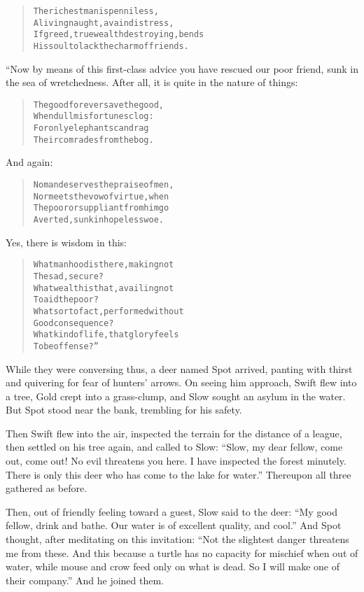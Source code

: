 \documentclass[article, twoside, 14pt]{memoir}
\renewenvironment{verbatim}{%
\begin{quote}%
\vskip -10pt%
\begin{alltt}\normalfont\large}{\end{alltt}%
\end{quote}%
\vskip -10pt
} %
\begin{document}
\begin{verbatim}
The richest man is penniless,
A living naught, a vain distress,
If greed, true wealth destroying, bends
His soul to lack the charm of friends.
\end{verbatim}
“Now by means of this first-class advice you have rescued our poor
friend, sunk in the sea of wretchedness. After all, it is quite in
the nature of things:

\begin{verbatim}
The good forever save the good,
    When dull misfortunes clog:
For only elephants can drag
    Their comrades from the bog.
\end{verbatim}
And again:

\begin{verbatim}
No man deserves the praise of men,
Nor meets the vow of virtue, when
The poor or suppliant from him go
Averted, sunk in hopeless woe.
\end{verbatim}
Yes, there is wisdom in this:

\begin{verbatim}
What manhood is there, making not
    The sad, secure?
What wealth is that, availing not
    To aid the poor?
What sort of act, performed without
    Good consequence?
What kind of life, that glory feels
    To be offense?”
\end{verbatim}
While they were conversing thus, a deer named Spot arrived, panting
with thirst and quivering for fear of hunters' arrows. On seeing
him approach, Swift flew into a tree, Gold crept into a
grass-clump, and Slow sought an asylum in the water. But Spot stood
near the bank, trembling for his safety.

Then Swift flew into the air, inspected the terrain for the
distance of a league, then settled on his tree again, and called to
Slow:
``Slow, my dear fellow, come out, come out! No evil threatens you here. I have inspected the forest minutely. There is only this deer who has come to the lake for water.''
Thereupon all three gathered as before.

Then, out of friendly feeling toward a guest, Slow said to the
deer:
``My good fellow, drink and bathe. Our water is of excellent quality, and cool.''
And Spot thought, after meditating on this invitation:
``Not the slightest danger threatens me from these. And this because a turtle has no capacity for mischief when out of water, while mouse and crow feed only on what is dead. So I will make one of their company.''
And he joined them.
\end{document}
